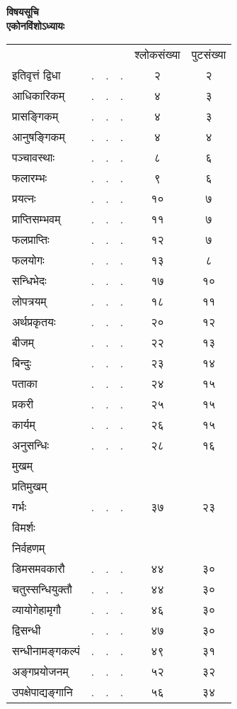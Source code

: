 \documentclass[11pt, openany]{book}
\begin{document}
\newpage
\begin{center}
\textbf{\LARGE विषयसूचि}\\

\vspace{5mm}
\textbf{\large एकोनविंशोऽध्यायः}\\

\noindent
\begin{tabular}{m{10em} m{2em} m{2em} m{2em} c c}
& & & & श्लोकसंख्या & पुटसंख्या\\
इतिवृत्तं द्विधा & . & . & . & २ & २\\
आधिकारिकम् &. &.& .& ४ &३\\
प्रासङ्गिकम्& . &. &. &४ &३\\
आनुषङ्गिकम्& .& . &. &४ &४\\
पञ्चावस्थाः& .& .& .& ८& ६\\
फलारम्भः& .& .& .& ९& ६\\
प्रयत्नः& .& .& .& १०& ७\\
प्राप्तिसम्भवम्& .& .& .& ११ &७\\
फलप्राप्तिः& .& .& .& १२ &७\\
फलयोगः& .& . &. &१३& ८\\
सन्धिभेदः &. &. &. &१७& १०\\
लोपत्रयम्& .& .& .& १८& ११\\
अर्थप्रकृतयः &. &. &. &२०& १२\\
बीजम् &. &. &. &२२ &१३\\
बिन्दुः& .& .& .& २३& १४\\
पताका &. &. &. &२४ &१५\\
प्रकरी& . &. &. &२५ &१५\\
कार्यम्& .& . &. &२६ &१५\\
अनुसन्धिः& . &. &.& २८& १६\\
मुखम्~~~~~~ \multirow{5}{*}{$\Bigg\}$} & & & & & \\
प्रतिमुखम्& & & & & \\
गर्भः & .& .& .& ३७& २३ \\
विमर्शः & & & & & \\
निर्वहणम् & & & & & \\
डिमसमवकारौ& . &. &. & ४४ &३०\\
चतुस्सन्धियुक्तौ& .& .& . &४४& ३०\\
व्यायोगेहामृगौ &. &. &. &४६& ३०\\
द्विसन्धी& .& .& .& ४७& ३०\\
सन्धीनामङ्गकल्पं& .& . &. &४९ &३१\\
अङ्गप्रयोजनम्& .& .& .& ५२& ३२\\
उपक्षेपाद्यङ्गानि& .& .& .& ५६ &३४
\end{tabular}
\end{center}
\end{document}
